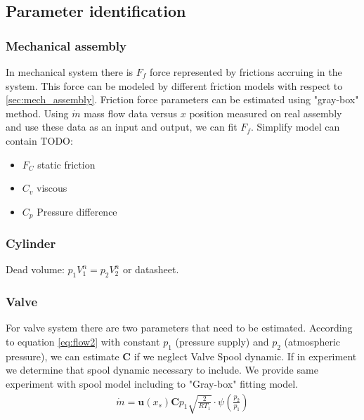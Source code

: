 \documentclass[class=article, crop=false]{standalone}
\begin{document}
\subsection{Parameter identification}

\subsubsection{Mechanical assembly}
In mechanical system there is $F_f$ force represented by frictions accruing
in the system. This force can be modeled by different friction models with
respect to \ref{sec:mech_assembly}. Friction force parameters can be
estimated using "gray-box" method. 
Using $\dot{m}$ mass flow data versus $x$ position measured on real assembly
and use these data as an input and output, we can fit $F_f$.
Simplify model can contain TODO:
\begin{itemize}
    \item $F_C$ static friction
    \item $C_v$ viscous
    \item $C_p$ Pressure difference
\end{itemize}

\subsubsection{Cylinder}
Dead volume: $p_1 V_1^n = p_2 V_2^n$ or datasheet.

\subsubsection{Valve}
For valve system there are two parameters that need to be estimated.
According to equation \ref{eq:flow2} with constant $p_1$ (pressure supply) and $p_2$
(atmospheric pressure), we can estimate $\boldsymbol{C}$ if we neglect Valve Spool dynamic.
If in experiment we determine that spool dynamic necessary to include. We
provide same experiment with spool model including to "Gray-box" fitting
model.
\begin{align}
    \dot{m} = \boldsymbol{u}(x_s) \boldsymbol{C}  p_1 \sqrt{\frac{2}{RT_1}}
    \cdot \psi\left(\frac{p_2}{p_1}\right)
    \label{eq:flow2}
\end{align}


\end{document}
